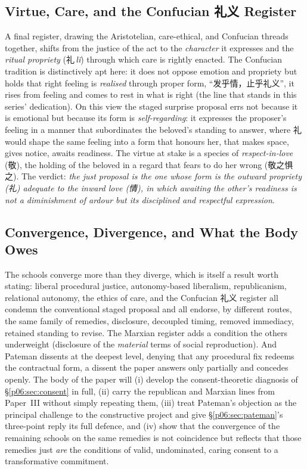 \documentclass[11pt,a4paper]{article}
\begin{document}
\subsection{Virtue, Care, and the Confucian \texorpdfstring{\cjkfont 礼义}{liyi} Register}

A final register, drawing the Aristotelian, care-ethical, and Confucian threads together, shifts from the justice of the act to the \emph{character} it expresses and the \emph{ritual propriety} (\cjkfont 礼\,\emph{l\v{i}}) through which care is rightly enacted. The Confucian tradition is distinctively apt here: it does not oppose emotion and propriety but holds that right feeling is \emph{realised} through proper form, ``\cjkfont 发乎情，止乎礼义'', it rises from feeling and comes to rest in what is right (the line that stands in this series' dedication). On this view the staged surprise proposal errs not because it is emotional but because its form is \emph{self-regarding}: it expresses the proposer's feeling in a manner that subordinates the beloved's standing to answer, where \cjkfont 礼 would shape the same feeling into a form that honours her, that makes space, gives notice, awaits readiness. The virtue at stake is a species of \emph{respect-in-love} (\cjkfont 敬), the holding of the beloved in a regard that fears to do her wrong (\cjkfont 敬之惧之). The verdict: \emph{the just proposal is the one whose form is the outward propriety (\cjkfont 礼) adequate to the inward love (\cjkfont 情), in which awaiting the other's readiness is not a diminishment of ardour but its disciplined and respectful expression}.

\subsection{Convergence, Divergence, and What the Body Owes}

The schools converge more than they diverge, which is itself a result worth stating: liberal procedural justice, autonomy-based liberalism, republicanism, relational autonomy, the ethics of care, and the Confucian \cjkfont 礼义 register all condemn the conventional staged proposal and all endorse, by different routes, the same family of remedies, disclosure, decoupled timing, removed immediacy, retained standing to revise. The Marxian register adds a condition the others underweight (disclosure of the \emph{material} terms of social reproduction). And Pateman dissents at the deepest level, denying that any procedural fix redeems the contractual form, a dissent the paper answers only partially and concedes openly. The body of the paper will (i) develop the consent-theoretic diagnosis of §\ref{p06:sec:consent} in full, (ii) carry the republican and Marxian lines from Paper~III without simply repeating them, (iii) treat Pateman's objection as the principal challenge to the constructive project and give §\ref{p06:sec:pateman}'s three-point reply its full defence, and (iv) show that the convergence of the remaining schools on the same remedies is not coincidence but reflects that those remedies just \emph{are} the conditions of valid, undominated, caring consent to a transformative commitment.
\end{document}
